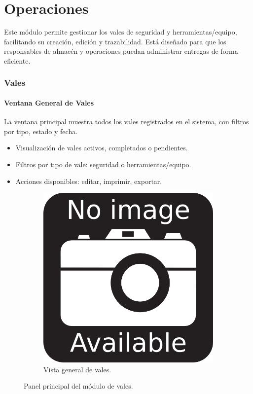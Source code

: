 \chapter{Operaciones}

Este módulo permite gestionar los vales de seguridad y herramientas/equipo, facilitando su creación, edición y trazabilidad. Está diseñado para que los responsables de almacén y operaciones puedan administrar entregas de forma eficiente.

\subsection{Vales}

\subsubsection{Ventana General de Vales}

La ventana principal muestra todos los vales registrados en el sistema, con filtros por tipo, estado y fecha.

\begin{itemize}
    \item Visualización de vales activos, completados o pendientes.
    \item Filtros por tipo de vale: seguridad o herramientas/equipo.
    \item Acciones disponibles: editar, imprimir, exportar.
\end{itemize}

\begin{figure}[h]
\centering
\begin{subfigure}{0.4\textwidth}
    \includegraphics[width=\textwidth]{imgs/no-image.png}
    \caption{Vista general de vales.}
    \label{fig:operaciones1}
\end{subfigure}
\caption{Panel principal del módulo de vales.}
\end{figure}

